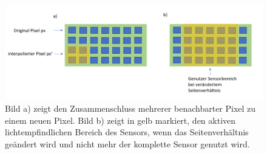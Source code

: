 %
\begin{figure}[!htb]
	\centering
	\includegraphics[width=1.\linewidth]{images/AufloesungSensor.png}
	\caption[Nachbarschaftsoperation auf Sensoren]{Bild a) zeigt den Zusammenschluss mehrerer benachbarter Pixel zu einem neuen Pixel. Bild b) zeigt in gelb markiert, den aktiven lichtempfindlichen Bereich des Sensors, wenn das Seitenverhältnis geändert wird und nicht mehr der komplette Sensor genutzt wird.} 
	\label{fig:SensorResolutions}
\end{figure}


%





